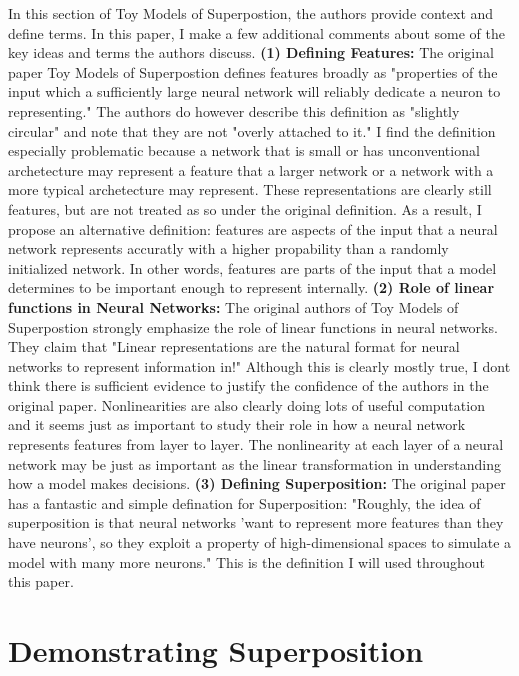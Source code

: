 \documentclass{article} %
\begin{document}
In this section of Toy Models of Superpostion\cite{elhage2022toy}, the authors
provide context and define terms.  In this paper, I make a few additional comments 
about some of the key ideas and terms the authors discuss. \newline \newline
\textbf{(1) Defining Features: }The original paper Toy Models of Superpostion
defines features broadly as "properties of the input which a sufficiently large 
neural network will reliably dedicate a neuron to representing." The authors do
however describe this definition as "slightly circular" and note that they are
not "overly attached to it." I find the definition especially problematic because a network that is small or
has unconventional archetecture may represent a feature that a larger network
or a network with a more typical archetecture may represent. These 
representations are clearly still features, but are not treated as so under the
original definition.\newline\newline
As a result, I propose an alternative definition: features are aspects of the
input that a neural network represents accuratly with a higher propability than 
a randomly initialized network. In other words, features are parts of the input 
that a model determines to be important enough to represent internally.\newline\newline
\textbf{(2) Role of linear functions in Neural Networks: }The original authors of
Toy Models of Superpostion strongly emphasize the role of linear functions in
neural networks. They claim that "Linear representations are the natural format 
for neural networks to represent information in!" Although this is clearly 
mostly true, I dont think there is sufficient evidence to justify the confidence 
of the authors in the original paper. Nonlinearities are also clearly doing lots 
of useful computation and it seems just as important to study their role in how 
a neural network represents features from layer to layer. The nonlinearity at 
each layer of a neural network may be just as important as the linear 
transformation in understanding how a model makes decisions.\newline\newline
\textbf{(3) Defining Superposition: } The original paper has a fantastic and
simple defination for Superposition: "Roughly, the idea of 
superposition is that neural networks 'want to represent more features than they 
have neurons', so they exploit a property of high-dimensional spaces to 
simulate a model with many more neurons." This is the definition I will used
throughout this paper.

\section{Demonstrating Superposition}



\end{document}
